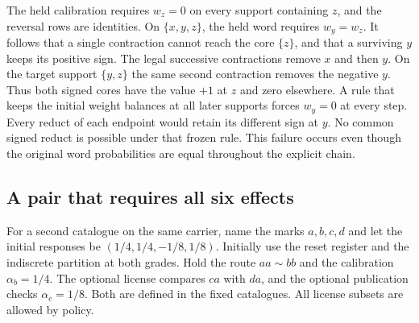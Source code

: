 The held calibration requires \(w_z=0\) on every support containing
\(z\), and the reversal rows are identities. On
\(\{x,y,z\}\), the held word requires \(w_y=w_z\).
It follows that a single contraction cannot reach the core
\(\{z\}\), and that a surviving \(y\) keeps its positive sign.
The legal successive contractions remove \(x\) and then \(y\).
On the target support \(\{y,z\}\) the same second contraction
removes the negative \(y\). Thus both signed cores have the value
\(+1\) at \(z\) and zero elsewhere.
A rule that keeps the initial weight balances at all later supports
forces \(w_y=0\) at every step. Every reduct of each endpoint would
retain its different sign at \(y\). No common signed reduct is possible
under that frozen rule. This failure occurs even though the original
word probabilities are equal throughout the explicit chain.

\subsection{A pair that requires all six effects}\label{sec:omissions}

For a second catalogue on the same carrier, name the marks
\(a,b,c,d\) and let the initial responses be
\((1/4,1/4,-1/8,1/8)\).
Initially use the reset register and the indiscrete partition at both
grades. Hold the route \(aa\sim bb\) and the calibration
\(\alpha_b=1/4\). The optional license compares \(ca\) with \(da\),
and the optional publication checks \(\alpha_c=1/8\).
Both are defined in the fixed catalogues. All license subsets are
allowed by policy.

